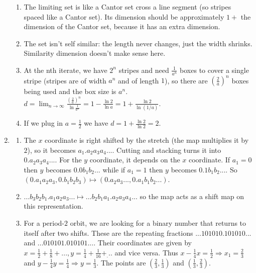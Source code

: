 \documentclass[12pt,letterpaper,noanswers]{exam}
\begin{document}
\begin{enumerate}
\begin{enumerate}
 \item The limiting set is like a Cantor set cross a line segment (so stripes spaced like a Cantor set).  Its dimension should be approximately $1+$ the dimension of the Cantor set, because it has an extra dimension.  \item The set isn't self similar: the length never changes, just the width shrinks. Similarity dimension doesn't make sense here.
 \item At the nth iterate, we have $2^n$ stripes and need $\frac{1}{a^n}$ boxes to cover a single stripe (stripes are of width $a^n$ and of length $1$), so there
 are $\left(\frac{2}{a}\right)^n$ boxes being used and the box size is $a^n$.  
 $d = \lim_{n\rightarrow\infty} \frac{\left(\frac{2}{a}\right)^n}{\ln \frac{1}{a^n}} = 1- \frac{\ln 2}{\ln a} = 1+ \frac{\ln 2}{\ln (1/a)}.$
 \item If we plug in $a = \frac{1}{2}$ we have $d = 1+ \frac{\ln 2}{\ln 2} = 2$.
 \end{enumerate}
 
 \item
 \begin{enumerate}
 \item The $x$ coordinate is right shifted by the stretch (the map multiplies it by $2$), so it becomes $a_1.a_2a_3a_4...$.
 Cutting and stacking turns it into $0.a_2a_3a_4...$.  For the $y$ coordinate, it depends on the $x$ coordinate.
 If $a_1 = 0$ then $y$ becomes $0.0b_1b_2...$ while if $a_1 = 1$ then $y$ becomes $0.1b_1b_2...$.  So
 $(0.a_1a_2a_3,0.b_1b_2b_3) \mapsto (0.a_2a_3...,0.a_1b_1b_2...)$.
 \item $...b_3b_2b_1.a_1a_2a_3... \mapsto ...b_2b_1a_1.a_2a_3a_4...$ so the map acts as a shift map on
 this representation.
 \item For a period-$2$ orbit, we are looking for a binary number that returns to itself after two shifts.  These are the repeating fractions
 $...101010.101010...$ and $...010101.010101...$.  Their coordinates are given by 
 $x = \frac{1}{2}+\frac{1}{8}+..., y = \frac{1}{4}+\frac{1}{16}+_...$ and vice versa.
 Thus $x - \frac{1}{4}x = \frac{1}{2} \Rightarrow x_1 = \frac{2}{3}$ and $y-\frac{1}{4}y = \frac{1}{4} \Rightarrow y = \frac{1}{3}$.  The points are
 $(\frac{2}{3},\frac{1}{3})$ and $(\frac{1}{3},\frac{2}{3})$. 
 \end{enumerate}
\end{enumerate}
\end{document}
